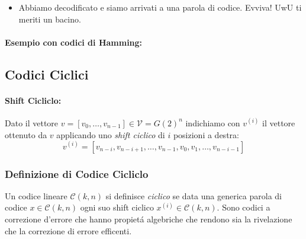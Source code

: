 \begin{enumerate}
{\begin{itemize}
{\begin{gather}
                                \begin{bmatrix}
                                1 & 1 & 0 \\ 
                                0 & 1 & 1 \\ 
                                1 & 0 & 1 \\ 
                                1 & 0 & 0 \\
                                0 & 1 & 0 \\
                                0 & 0 & 1 
                                \end{bmatrix} =
                                    \begin{bmatrix}
                                    0 & 0 & 0 
                                    \end{bmatrix}\nonumber   
                    \end{gather}
                        }
                        \item {Abbiamo decodificato e siamo arrivati a una parola di codice. Evviva! UwU ti meriti un bacino.}
                    \end{itemize}
                }
            \end{enumerate}
            \paragraph{Esempio con codici di Hamming:} 

    \subsection{Codici Ciclici}
        \paragraph{Shift Cicliclo:}\label{shift ciclico}
            \begin{sloppypar}
                Dato il vettore ${v = [v_0,\dots,v_{n-1}]\in \mathcal{V} = G(2)^n}$ indichiamo con $v^{(i)}$ il vettore ottenuto da $v$ applicando uno 
                \emph{shift ciclico} di $i$ posizioni a destra:
                \[
                    v^{(i)} = [v_{n-i},v_{n-i+1}, \dots, v_{n-1},v_0,v_1,\dots, v_{n-i-1}]    
                \]     
            \end{sloppypar}
        \subsubsection{Definizione di Codice Cicliclo}
            Un codice lineare $\mathcal{C}(k,n)$ si definisce \emph{ciclico} se data una generica parola di codice $x\in \mathcal{C}(k,n)$ ogni suo
            shift ciclico $x^{(i)}\in \mathcal{C}(k,n)$. Sono codici a correzione d'errore che hanno propietá algebriche che rendono sia la rivelazione che la correzione
            di errore efficenti.

